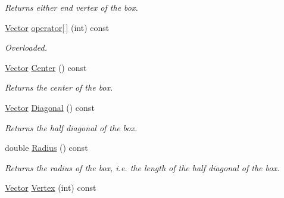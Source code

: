 \begin{DoxyCompactItemize}
\begin{DoxyCompactList}\small\item\em \-Returns either end vertex of the box. \end{DoxyCompactList}\item 
\hypertarget{class_box_ae638073ba0eb5b6cb7a1f9de3b9a7bd8}{
\hyperlink{class_vector}{\-Vector} \hyperlink{class_box_ae638073ba0eb5b6cb7a1f9de3b9a7bd8}{operator\mbox{[}$\,$\mbox{]}} (int) const }
\label{class_box_ae638073ba0eb5b6cb7a1f9de3b9a7bd8}

\begin{DoxyCompactList}\small\item\em \-Overloaded. \end{DoxyCompactList}\item 
\hypertarget{class_box_a44e2805cb2a7acaaa3937522fae56d23}{
\hyperlink{class_vector}{\-Vector} \hyperlink{class_box_a44e2805cb2a7acaaa3937522fae56d23}{\-Center} () const }
\label{class_box_a44e2805cb2a7acaaa3937522fae56d23}

\begin{DoxyCompactList}\small\item\em \-Returns the center of the box. \end{DoxyCompactList}\item 
\hypertarget{class_box_a3e077400dd38d177c39bcc711788eed9}{
\hyperlink{class_vector}{\-Vector} \hyperlink{class_box_a3e077400dd38d177c39bcc711788eed9}{\-Diagonal} () const }
\label{class_box_a3e077400dd38d177c39bcc711788eed9}

\begin{DoxyCompactList}\small\item\em \-Returns the half diagonal of the box. \end{DoxyCompactList}\item 
\hypertarget{class_box_a44dd9300bf9713c9190c3a1e69ef5728}{
double \hyperlink{class_box_a44dd9300bf9713c9190c3a1e69ef5728}{\-Radius} () const }
\label{class_box_a44dd9300bf9713c9190c3a1e69ef5728}

\begin{DoxyCompactList}\small\item\em \-Returns the radius of the box, i.\-e. the length of the half diagonal of the box. \end{DoxyCompactList}\item 
\hypertarget{class_box_a35f5775304c754981b8a38d141737880}{
\hyperlink{class_vector}{\-Vector} \hyperlink{class_box_a35f5775304c754981b8a38d141737880}{\-Vertex} (int) const }
\label{class_box_a35f5775304c754981b8a38d141737880}


\end{DoxyCompactItemize}
